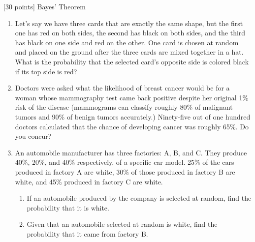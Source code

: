 [30 points] Bayes' Theorem\\
\begin{enumerate}
    \item Let's say we have three cards that are exactly the same shape, but the first one has red on both sides, the second has black on both sides, and the third has black on one side and red on the other.
    One card is chosen at random and placed on the ground after the three cards are mixed together in a hat. What is the probability that the selected card's opposite side is colored black if its top side is red?
\vspace{0.1in}


    \item Doctors were asked what the likelihood of breast cancer would be for a woman whose mammography test came back positive despite her original 1\% risk of the disease (mammograms can classify roughly 80\% of malignant tumors and 90\% of benign tumors accurately.)
    Ninety-five out of one hundred doctors calculated that the chance of developing cancer was roughly 65\%. Do you concur?  \\
    


    
    \item An automobile manufacturer has three factories: A, B, and C. They produce 40\%, 20\%, and 40\% respectively, of a specific car model. 25\% of the cars produced in factory A are white, 30\% of those produced in factory B are white, and 45\% produced in factory C are white.
    \begin{enumerate}
        \item If an automobile produced by the company is selected at random, find the probability that it is white.
        \item Given that an automobile selected at random is white, find the probability that it came from factory B.
    \end{enumerate}


\end{enumerate}